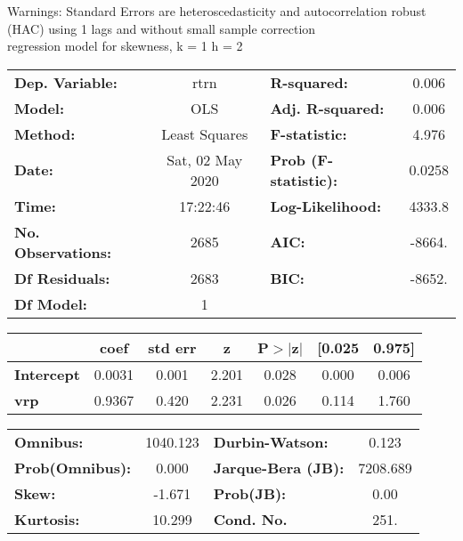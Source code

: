 Warnings: \newline
 [1] Standard Errors are heteroscedasticity and autocorrelation robust (HAC) using 1 lags and without small sample correction\\ 

regression model for skewness, k = 1 h = 2\begin{center}
\begin{tabular}{lclc}
\toprule
\textbf{Dep. Variable:}    &       rtrn       & \textbf{  R-squared:         } &     0.006   \\
\textbf{Model:}            &       OLS        & \textbf{  Adj. R-squared:    } &     0.006   \\
\textbf{Method:}           &  Least Squares   & \textbf{  F-statistic:       } &     4.976   \\
\textbf{Date:}             & Sat, 02 May 2020 & \textbf{  Prob (F-statistic):} &   0.0258    \\
\textbf{Time:}             &     17:22:46     & \textbf{  Log-Likelihood:    } &    4333.8   \\
\textbf{No. Observations:} &        2685      & \textbf{  AIC:               } &    -8664.   \\
\textbf{Df Residuals:}     &        2683      & \textbf{  BIC:               } &    -8652.   \\
\textbf{Df Model:}         &           1      & \textbf{                     } &             \\
\bottomrule
\end{tabular}
\begin{tabular}{lcccccc}
                   & \textbf{coef} & \textbf{std err} & \textbf{z} & \textbf{P$> |$z$|$} & \textbf{[0.025} & \textbf{0.975]}  \\
\midrule
\textbf{Intercept} &       0.0031  &        0.001     &     2.201  &         0.028        &        0.000    &        0.006     \\
\textbf{vrp}       &       0.9367  &        0.420     &     2.231  &         0.026        &        0.114    &        1.760     \\
\bottomrule
\end{tabular}
\begin{tabular}{lclc}
\textbf{Omnibus:}       & 1040.123 & \textbf{  Durbin-Watson:     } &    0.123  \\
\textbf{Prob(Omnibus):} &   0.000  & \textbf{  Jarque-Bera (JB):  } & 7208.689  \\
\textbf{Skew:}          &  -1.671  & \textbf{  Prob(JB):          } &     0.00  \\
\textbf{Kurtosis:}      &  10.299  & \textbf{  Cond. No.          } &     251.  \\
\bottomrule
\end{tabular}
\end{center}

